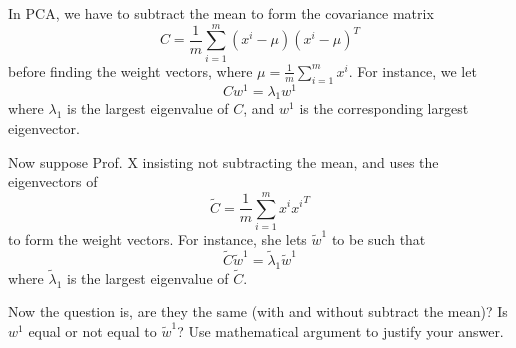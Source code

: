 \documentclass[twoside,10pt]{article}
\begin{document}
In PCA, we have to subtract the mean to form the covariance matrix 
\[
C = \frac 1 m \sum_{i=1}^m (x^i - \mu)(x^i - \mu)^T 
\]
before finding the weight vectors, where $\mu = \frac 1m \sum_{i=1}^m x^i$. For instance, we let
\[
 C w^1= \lambda_1 w^1
\]
where $\lambda_1$ is the largest eigenvalue of $C$, and $w^1$ is the corresponding largest eigenvector.  

Now suppose Prof. X insisting not subtracting the mean, and uses the eigenvectors of 
\[
\tilde C = \frac 1 m \sum_{i=1}^m x^i {x^i}^T
\]
to form the weight vectors. For instance, she lets $\tilde w^1$ to be such that 
\[
\tilde C \tilde w^1 = \tilde \lambda_1 \tilde w^1
\]
where $\tilde \lambda_1$ is the largest eigenvalue of $\tilde C$. 

Now the question is, are they the same (with and without subtract the mean)? Is $w^1$ equal or not equal to $\tilde w^1$? Use mathematical argument to justify your answer.
\end{document}

